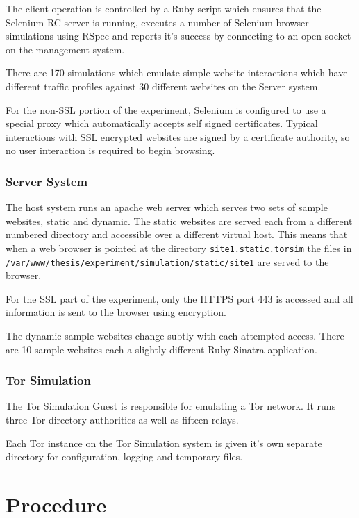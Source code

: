 The client operation is controlled by a Ruby script which ensures that the Selenium-RC server is running, executes a number of Selenium browser simulations using RSpec and reports it's success by connecting to an open socket on the management system.

There are 170 simulations which emulate simple website interactions which have different traffic profiles against 30 different websites on the Server system.

For the non-SSL portion of the experiment, Selenium is configured to use a special proxy which automatically accepts self signed certificates. Typical interactions with SSL encrypted websites are signed by a certificate authority, so no user interaction is required to begin browsing.

\subsubsection{Server System}

The host system runs an apache web server which serves two sets of sample websites, static and dynamic. The static websites are served each from a different numbered directory and accessible over a different virtual host. This means that when a web browser is pointed at the directory \verb+site1.static.torsim+ the files in \verb+/var/www/thesis/experiment/simulation/static/site1+ are served to the browser.

For the SSL part of the experiment, only the HTTPS port 443 is accessed and all information is sent to the browser using encryption.

The dynamic sample websites change subtly with each attempted access. There are 10 sample websites each a slightly different Ruby Sinatra application.

\subsubsection{Tor Simulation}

The Tor Simulation Guest is responsible for emulating a Tor network. It runs three Tor directory authorities as well as fifteen relays.

Each Tor instance on the Tor Simulation system is given it's own separate directory for configuration, logging and temporary files.

\section{Procedure}

